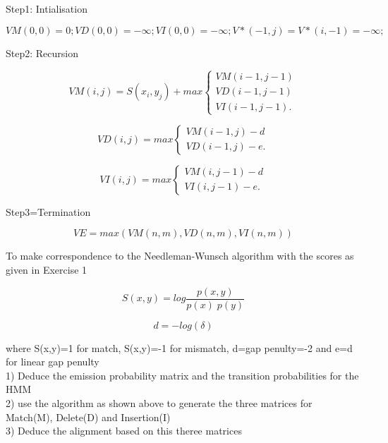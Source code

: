 \documentclass[a4paper,11pt]{article}
\begin{document}
Step1: Intialisation




\[
VM(0,0)=0; VD(0,0)=-\infty ; VI(0,0)=-\infty;
V*(-1,j)=V*(i,-1)=-\infty;\]


Step2: Recursion

\[ VM(i,j) =S(x_{i},y_{j})+max \left\{ \begin{array}{ll}
	 VM(i-1,j-1)\\
         VD(i-1,j-1) \\
         VI(i-1,j-1)  .\end{array} \right. \] 

\[ VD(i,j) =max \left\{ \begin{array}{ll}
         VM(i-1,j)-d \\
         VD(i-1,j)-e  .\end{array} \right. \] 

\[ VI(i,j) =max \left\{ \begin{array}{ll}
         VM(i,j-1)-d \\
         VI(i,j-1)-e  .\end{array} \right. \]



Step3=Termination

\[ VE=max(VM(n,m),VD(n,m),VI(n,m))\]

   


To make correspondence to the Needleman-Wunsch algorithm with the scores as given in Exercise 1

\[
S(x,y)=log\frac{p(x,y)}{p(x)\; p(y)}\]

\[
d=-log(\delta)\]

where S(x,y)=1 for match, S(x,y)=-1 for mismatch, d=gap penulty=-2 and e=d for linear gap penulty\\

1) Deduce the emission probability matrix and the transition probabilities for the HMM \\
2) use the algorithm as shown above to generate the three matrices for Match(M), Delete(D) and Insertion(I)\\
3) Deduce the alignment based on this theree matrices
\end{document}
